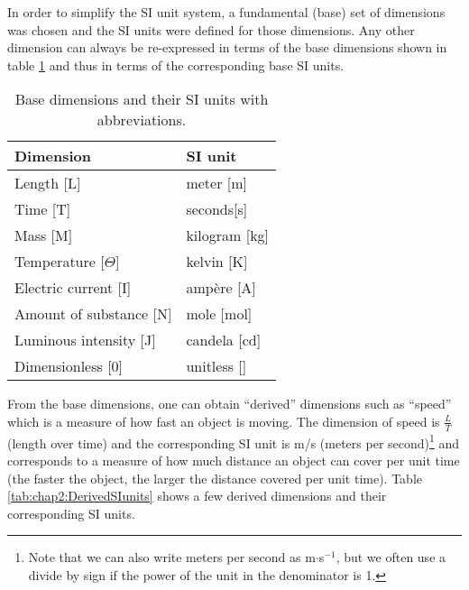 In order to simplify the SI unit system, a fundamental (base) set of dimensions was chosen and the SI units were defined for those dimensions. Any other dimension can always be re-expressed in terms of the base dimensions shown in table \ref{tab:chap2:SIunits} and thus in terms of the corresponding base SI units.

\begin{table}[!h]
\centering
\begin{tabular}{ll }
\textbf{Dimension}&\textbf{SI unit}\\
\hline
\hline
Length [L]& meter [m]\\ \hline
Time [T]& seconds[s] \\ \hline
Mass [M]& kilogram [kg]\\ \hline
Temperature [$\Theta$]& kelvin [K] \\ \hline
Electric current [I]& amp\`ere [A]\\ \hline
Amount of substance [N]& mole [mol] \\ \hline
Luminous intensity [J]& candela [cd] \\ \hline
Dimensionless [0]& unitless [] \\ \hline
\end{tabular}
\caption{\label{tab:chap2:SIunits} Base dimensions and their SI units with abbreviations.}
\end{table}

From the base dimensions, one can obtain ``derived'' dimensions such as ``speed'' which is a measure of how fast an object is moving. The dimension of speed is $\frac{L}{T}$ (length over time) and the corresponding SI unit is m/s (meters per second)\footnote{Note that we can also write meters per second as m$\cdot$s$^{-1}$, but we often use a divide by sign if the power of the unit in the denominator is 1.} and corresponds to a measure of how much distance an object can cover per unit time (the faster the object, the larger the distance covered per unit time). Table \ref{tab:chap2:DerivedSIunits} shows a few derived dimensions and their corresponding SI units.

